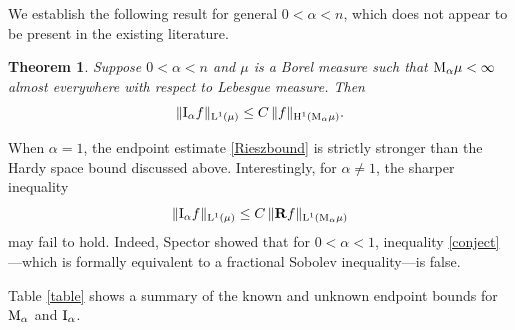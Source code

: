 \documentclass[11pt, a4paper, reqno]{amsart}
\newcommand{\al}{\alpha}
\newcommand{\Lup}{\textup{L}}
\newcommand{\Har}{\textup{H}}
\newtheorem{theorem}{Theorem}[section]
\theoremstyle{definition}
\theoremstyle{remark}
\begin{document}
We establish the following result for general $0<\alpha<n$, which does not
appear to be present in the existing literature.

\begin{theorem}\label{Hardy}
Suppose $0<\alpha<n$ and $\mu$ is a Borel measure such that $\textup{M}_\alpha \mu < \infty$
almost everywhere with respect to Lebesgue measure. Then
\[
\|\textup{I}_\alpha f\|_{\Lup^1(\mu)} \le C\,\|f\|_{\Har^1(\textup{M}_\alpha \mu)}.
\]
\end{theorem}

When $\alpha=1$, the endpoint estimate \eqref{Rieszbound} is strictly stronger than the Hardy space bound discussed above. Interestingly, for $\alpha \neq 1$, the sharper inequality
\begin{equation}\label{conject}
\|\textup{I}_\alpha f\|_{\Lup^1(\mu)} \le C\,\|\mathbf R f\|_{\Lup^1(\textup{M}_\alpha \mu)}
\end{equation}
may fail to hold. Indeed, Spector \cite{Sp} showed that for $0<\alpha<1$, inequality \eqref{conject}—which is formally equivalent to a fractional Sobolev inequality—is false.



Table \ref{table} shows a summary of the known and unknown endpoint bounds for $\textup{M}_\al$ and $\textup{I}_\al$.
\end{document}

